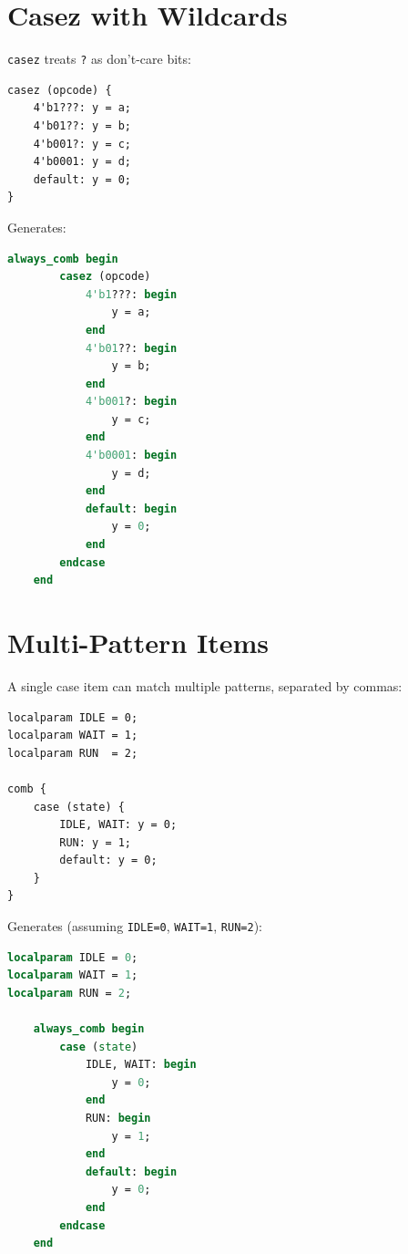 \documentclass[lang=en,11pt]{elegantbook}
\newcommand{\code}[1]{\texttt{#1}}
\begin{document}
\section{Casez with Wildcards}

\code{casez} treats \code{?} as don't-care bits:

\begin{lstlisting}[language=Slip]
casez (opcode) {
    4'b1???: y = a;
    4'b01??: y = b;
    4'b001?: y = c;
    4'b0001: y = d;
    default: y = 0;
}
\end{lstlisting}

Generates:

\begin{lstlisting}[language=SystemVerilog]
    always_comb begin
        casez (opcode)
            4'b1???: begin
                y = a;
            end
            4'b01??: begin
                y = b;
            end
            4'b001?: begin
                y = c;
            end
            4'b0001: begin
                y = d;
            end
            default: begin
                y = 0;
            end
        endcase
    end
\end{lstlisting}

\section{Multi-Pattern Items}

A single case item can match multiple patterns, separated by commas:

\begin{lstlisting}[language=Slip]
localparam IDLE = 0;
localparam WAIT = 1;
localparam RUN  = 2;

comb {
    case (state) {
        IDLE, WAIT: y = 0;
        RUN: y = 1;
        default: y = 0;
    }
}
\end{lstlisting}

Generates (assuming \code{IDLE=0}, \code{WAIT=1}, \code{RUN=2}):

\begin{lstlisting}[language=SystemVerilog]
localparam IDLE = 0;
localparam WAIT = 1;
localparam RUN = 2;

    always_comb begin
        case (state)
            IDLE, WAIT: begin
                y = 0;
            end
            RUN: begin
                y = 1;
            end
            default: begin
                y = 0;
            end
        endcase
    end
\end{lstlisting}
\end{document}
